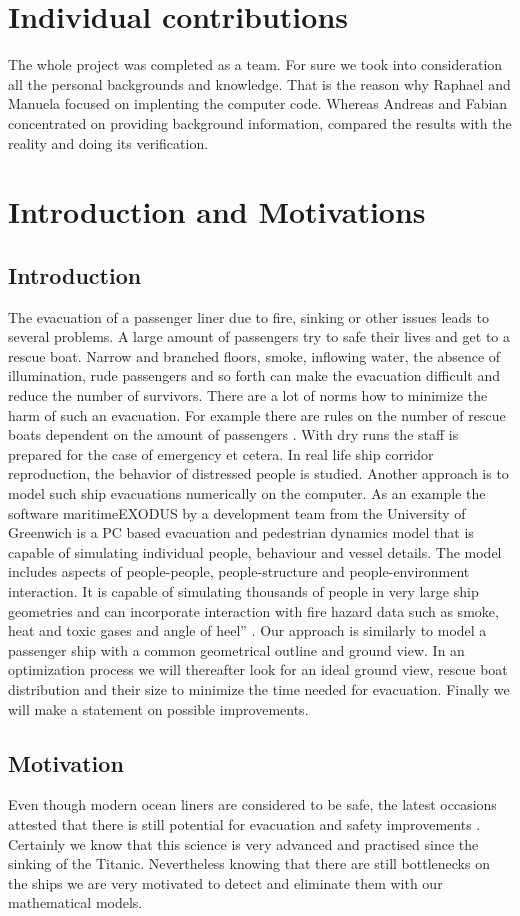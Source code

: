 \documentclass[11pt]{article}
\begin{document}
\section{Individual contributions}
The whole project was completed as a team. For sure we took into consideration all the personal backgrounds and  knowledge. That is the reason why Raphael and Manuela focused on implenting the computer code. Whereas Andreas and Fabian concentrated on providing background information, compared the results with the reality and doing its verification.
\section{Introduction and Motivations}
\subsection{Introduction}
The evacuation of a passenger liner due to fire, sinking or other issues leads to several problems. A large amount of passengers try to safe their lives and get to a rescue boat. Narrow and branched floors, smoke, inflowing water, the absence of illumination, rude passengers and so forth can make the evacuation difficult and reduce the number of survivors.
There are a lot of norms how to minimize the harm of such an evacuation. For example there are rules on the number of rescue boats dependent on the amount of passengers \cite{SOLAS}. With dry runs the staff is prepared for the case of emergency et cetera. In real life ship corridor reproduction, the behavior of distressed people is studied.
Another approach is to model such ship evacuations numerically on the computer. As an example the software maritimeEXODUS by a development team from the University of Greenwich is a PC based evacuation and pedestrian dynamics model that is capable of simulating individual people, behaviour and vessel details. The model includes aspects of people-people, people-structure and people-environment interaction. It is capable of simulating thousands of people in very large ship geometries and can incorporate interaction with fire hazard data such as smoke, heat and toxic gases and angle of heel” \cite{EXODUS}.
Our approach is similarly to model a passenger ship with a common geometrical outline and ground view. In an optimization process we will thereafter look for an ideal ground view, rescue boat distribution and their size to minimize the time needed for evacuation. Finally we will make a statement on possible improvements.
\newpage
\subsection{Motivation}
Even though modern ocean liners are considered to be safe, the latest occasions attested that there is still potential for evacuation and safety improvements \cite{concordia}. Certainly we know that this science is very advanced and practised since the sinking of the Titanic. Nevertheless knowing that there are still bottlenecks on the ships we are very motivated to detect and eliminate them with our mathematical models.
\end{document}
